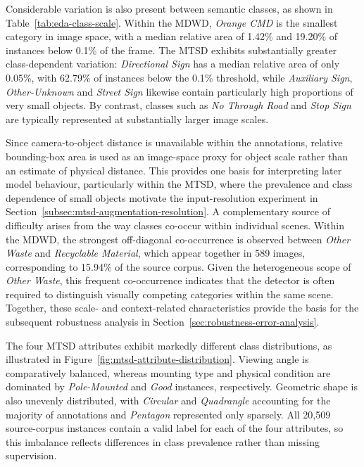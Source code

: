 \noindent Considerable variation is also present between semantic classes, as shown in Table~\ref{tab:eda-class-scale}. Within the \gls{MDWD}, \emph{Orange \gls{CMD}} is the smallest category in image space, with a median relative area of 1.42\% and 19.20\% of instances below 0.1\% of the frame. The \gls{MTSD} exhibits substantially greater class-dependent variation: \emph{Directional Sign} has a median relative area of only 0.05\%, with 62.79\% of instances below the 0.1\% threshold, while \emph{Auxiliary Sign}, \emph{Other-Unknown} and \emph{Street Sign} likewise contain particularly high proportions of very small objects. By contrast, classes such as \emph{No Through Road} and \emph{Stop Sign} are typically represented at substantially larger image scales.

\newpage
\noindent Since camera-to-object distance is unavailable within the annotations, relative bounding-box area is used as an image-space proxy for object scale rather than an estimate of physical distance. This provides one basis for interpreting later model behaviour, particularly within the \gls{MTSD}, where the prevalence and class dependence of small objects motivate the input-resolution experiment in Section~\ref{subsec:mtsd-augmentation-resolution}. A complementary source of difficulty arises from the way classes co-occur within individual scenes. Within the \gls{MDWD}, the strongest off-diagonal co-occurrence is observed between \emph{Other Waste} and \emph{Recyclable Material}, which appear together in 589 images, corresponding to 15.94\% of the source corpus. Given the heterogeneous scope of \emph{Other Waste}, this frequent co-occurrence indicates that the detector is often required to distinguish visually competing categories within the same scene. Together, these scale- and context-related characteristics provide the basis for the subsequent robustness analysis in Section~\ref{sec:robustness-error-analysis}.

The four \gls{MTSD} attributes exhibit markedly different class distributions, as illustrated in Figure~\ref{fig:mtsd-attribute-distribution}. Viewing angle is comparatively balanced, whereas mounting type and physical condition are dominated by \emph{Pole-Mounted} and \emph{Good} instances, respectively. Geometric shape is also unevenly distributed, with \emph{Circular} and \emph{Quadrangle} accounting for the majority of annotations and \emph{Pentagon} represented only sparsely. All 20,509 source-corpus instances contain a valid label for each of the four attributes, so this imbalance reflects differences in class prevalence rather than missing supervision.

